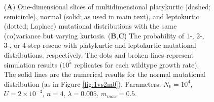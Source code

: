 \documentclass[9pt,twocolumn,twoside,lineno]{gsajnl}
\begin{document}
\begin{figure}[htbp]
\caption{
(\textbf{A}) One-dimensional slices of multidimensional platykurtic (dashed; semicircle), normal (solid; as used in main text), and leptokurtic (dotted; Laplace) mutational distributions with the same (co)variance but varying kurtosis.
(\textbf{B},\textbf{C}) The probability of 1-, 2-, 3-, or 4-step rescue with platykurtic and leptokurtic mutational distributions, respectively.
The dots and broken lines represent simulation results ($10^5$ replicates for each wildtype growth rate).
The solid lines are the numerical results for the normal mutational distribution (as in Figure \ref{fig:1vs2m0}).
Parameters: $N_0=10^4$, $U=2\times 10^{-3}$, $n=4$, $\lambda=0.005$, $m_{max}=0.5$.
}%
\label{fig:lepto_platy_prob}
\end{figure}
\end{document}
